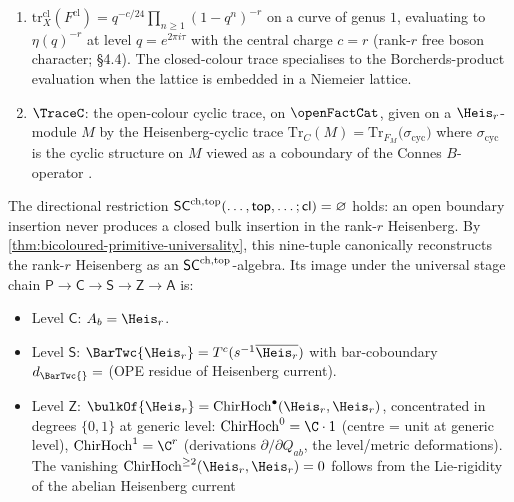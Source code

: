 \begin{example}
\begin{enumerate}[label=\textup{(\roman*)}]
of Definition~\ref{def:chiral-half-braiding}, the meromorphic family
$\{\sigma_{\Heis_r}(z)\}_{z \in X \setminus \{0\}}$ built from the
Heisenberg spectral coproduct $\Delta_z$, with first-order pole at
$z = 0$. On the rank-$r$ free-boson currents $J^a = \partial\phi^a$
the leading residue is the trace form
$\Res_{z=0}\sigma_{\Heis_r}(z) = Q_{ab}$, mediating the
bulk-to-boundary OPE residue $J^a(z)J^b(0) \sim Q_{ab}/z^2$
\textup(cf.\ \cite{FBZ04} \S 3.4\textup).
\item $\mathrm{tr}^{\mathrm{cl}}_X(F^{\mathrm{cl}}) = q^{-c/24}
\prod_{n \geq 1}(1 - q^n)^{-r}$ on a curve of genus $1$, evaluating
to $\eta(q)^{-r}$ at level $q = e^{2\pi i \tau}$ with the central
charge $c = r$ \textup(rank-$r$ free boson character;
\cite{FBZ04} \S 4.4\textup). The closed-colour trace specialises
to the Borcherds-product evaluation when the lattice is
embedded in a Niemeier lattice.
\item $\TraceC$: the open-colour cyclic trace, on
$\openFactCat$, given on a $\Heis_r$-module $M$ by the
Heisenberg-cyclic trace $\mathrm{Tr}_C(M) = \mathrm{Tr}_{F_M}\bigl(\sigma_{\mathrm{cyc}}\bigr)$
where $\sigma_{\mathrm{cyc}}$ is the cyclic structure on $M$
viewed as a coboundary of the Connes $B$-operator
\cite{Con85,LQ84}.
\end{enumerate}
The directional restriction $\mathsf{SC}^{\mathrm{ch},\mathrm{top}}(\ldots, \mathsf{top}, \ldots; \mathsf{cl})
= \varnothing$ holds: an open boundary insertion never produces a
closed bulk insertion in the rank-$r$ Heisenberg.
By \cref{thm:bicoloured-primitive-universality}, this nine-tuple
canonically reconstructs the rank-$r$ Heisenberg as an
$\mathsf{SC}^{\mathrm{ch},\mathrm{top}}$-algebra. Its image under the universal stage chain
$\mathsf{P} \to \mathsf{C} \to \mathsf{S} \to \mathsf{Z} \to \mathsf{A}$ is:
\begin{itemize}
\item Level $\mathsf{C}$: $A_b = \Heis_r$.
\item Level $\mathsf{S}$: $\BarTwc{\Heis_r}
= T^c(s^{-1} \overline{\Heis_r})$ with bar-coboundary
$d_{\BarTwc{}} = $ (OPE residue of Heisenberg current).
\item Level $\mathsf{Z}$: $\bulkOf{\Heis_r}
= \mathrm{ChirHoch}^\bullet(\Heis_r, \Heis_r)$, concentrated in
degrees $\{0, 1\}$ at generic level: $\mathrm{ChirHoch}^0 = \C \cdot 1$
\textup(centre = unit at generic level\textup),
$\mathrm{ChirHoch}^1 = \C^r$ \textup(derivations
$\partial / \partial Q_{ab}$, the level/metric deformations\textup).
The vanishing $\mathrm{ChirHoch}^{\geq 2}(\Heis_r, \Heis_r) = 0$
follows from the Lie-rigidity of the abelian Heisenberg current

\end{itemize}
\end{example}
